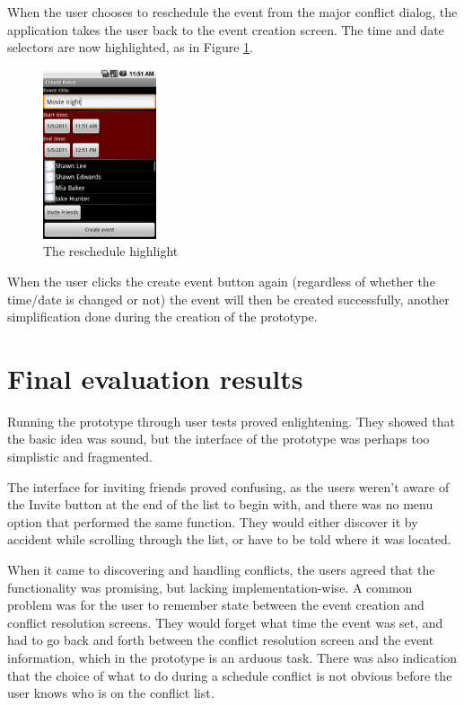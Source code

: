 \documentclass[a4paper,11pt]{report}
\begin{document}
When the user chooses to reschedule the event from the major conflict dialog,
the application takes the user back to the event creation screen. The time and
date selectors are now highlighted, as in Figure \ref{fig:reschedule}.

\begin{figure}[htb]
  \centering
  \includegraphics[height=50mm]{reschedule}
  \caption{The reschedule highlight}
  \label{fig:reschedule}
\end{figure}

When the user clicks the create event button again (regardless of whether the
time/date is changed or not) the event will then be created successfully,
another simplification done during the creation of the prototype.

\section{Final evaluation results}

Running the prototype through user tests proved enlightening. They showed that the
basic idea was sound, but the interface of the prototype was perhaps too
simplistic and fragmented.

The interface for inviting friends proved confusing, as the users weren't aware
of the Invite button at the end of the list to begin with, and there was no menu
option that performed the same function. They would either discover it by
accident while scrolling through the list, or have to be told where it was
located.

When it came to discovering and handling conflicts, the users agreed that the
functionality was promising, but lacking implementation-wise. A common problem
was for the user to remember state between the event creation and conflict
resolution screens. They would forget what time the event was set, and had to go
back and forth between the conflict resolution screen and the event information,
which in the prototype is an arduous task. There was also indication that the
choice of what to do during a schedule conflict is not obvious before the user
knows who is on the conflict list.
\end{document}
